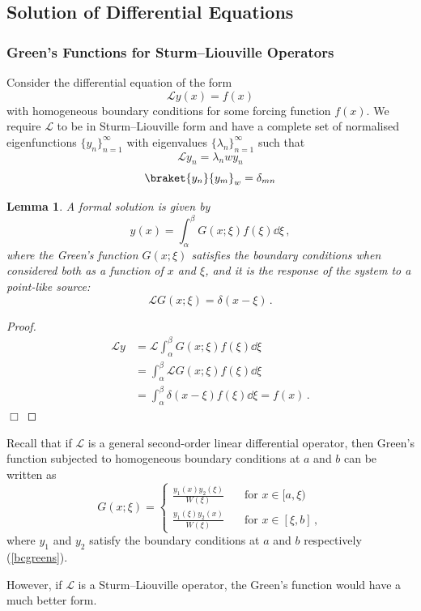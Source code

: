 \documentclass{article}
\theoremstyle{plain}\theoremheaderfont{\normalfont\itshape}\theorembodyfont{\rmfamily}\theoremseparator{.}\newtheorem*{rem}{Remark}\newtheorem*{ex}{Example}\newtheorem*{proof}{Proof}\newtheorem*{altp}{Alternative proof}
\theoremstyle{plain}\theoremheaderfont{\normalfont\bfseries}\theorembodyfont{\rmfamily}\theoremseparator{.}\newtheorem{thm}{Theorem}[section]\newtheorem{lem}[thm]{Lemma}\newtheorem{prop}[thm]{Proposition}\newtheorem*{cor}{Corollary}\newtheorem{defn}[thm]{Definition}\newtheorem{clm}[thm]{Claim}\newtheorem{clminproof}{Claim}
\theoremstyle{break}\theoremheaderfont{\normalfont\itshape}\theorembodyfont{\rmfamily}\theoremseparator{.\medskip}\newtheorem*{proofskip}{Proof}\newtheorem*{exs}{Examples}\newtheorem*{rems}{Remarks}
\theoremstyle{break}\theoremheaderfont{\normalfont\bfseries}\theorembodyfont{\rmfamily}\theoremseparator{.\medskip}\newtheorem{lemskip}[thm]{Lemma}\newtheorem{defnskip}[thm]{Definition}\newtheorem{propskip}[thm]{Proposition}\newtheorem{thmskip}[thm]{Theorem}
\numberwithin{equation}{section}
\newcommand{\qed}{\hfill\ensuremath{\Box}}
\begin{document}
	\subsection{Solution of Differential Equations}
	\subsubsection{Green's Functions for Sturm--Liouville Operators}
	Consider the differential equation of the form
	\[\mathcal{L}y(x)=f(x)\]
	with homogeneous boundary conditions for some forcing function \(f(x)\). We require \(\mathcal{L}\) to be in Sturm--Liouville form and have a complete set of normalised eigenfunctions \(\{y_n\}_{n=1}^{\infty}\) with eigenvalues \(\{\lambda_n\}_{n=1}^{\infty}\) such that
	\[\mathcal{L}y_n=\lambda_n wy_n\]
	\[\braket{y_n}{y_m}_w=\delta_{mn}\]
	\begin{lem}
		A formal solution is given by
		\[y(x)=\int_{\alpha}^{\beta}G(x;\xi)f(\xi)\dd{\xi}\,,\]
		where the Green's function \(G(x;\xi)\) satisfies the boundary conditions when considered both as a function of \(x\) and \(\xi\), and it is the response of the system to a point-like source:
		\[\mathcal{L}G(x;\xi)=\delta(x-\xi)\,.\]
	\end{lem}
	\begin{proof}
		\begin{align*}
			\mathcal{L}y&=\mathcal{L}\int_{\alpha}^{\beta}G(x;\xi)f(\xi)\dd{\xi}\\
			&=\int_{\alpha}^{\beta}\mathcal{L}G(x;\xi)f(\xi)\dd{\xi}\\
			&=\int_{\alpha}^{\beta}\delta(x-\xi)f(\xi)\dd{\xi}=f(x)\,.
		\end{align*}\qed
	\end{proof}

	Recall that if \(\mathcal{L}\) is a general second-order linear differential operator, then Green's function subjected to homogeneous boundary conditions at \(a\) and \(b\) can be written as
	\[G(x;\xi)=\left\{\begin{aligned}
		\frac{y_1(x)y_2(\xi)}{W(\xi)} & \quad\text{for }x\in[a,\xi)\\
		\frac{y_1(\xi)y_2(x)}{W(\xi)} & \quad\text{for }x\in[\xi,b]\,,
	\end{aligned}\right.\]
	where \(y_1\) and \(y_2\) satisfy the boundary conditions at \(a\) and \(b\) respectively (\cref{bcgreens}).

	However, if \(\mathcal{L}\) is a Sturm--Liouville operator, the Green's function would have a much better form.
\end{document}
